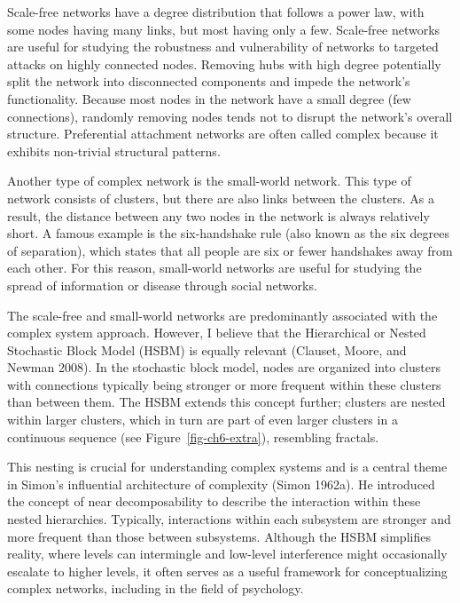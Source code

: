 \documentclass[
  a4paper,
  DIV=11,
  numbers=noendperiod]{scrreprt}
\begin{document}
Scale-free networks have a degree distribution that follows a power law,
with some nodes having many links, but most having only a few.
Scale-free networks are useful for studying the robustness and
vulnerability of networks to targeted attacks on highly connected nodes.
Removing hubs with high degree potentially split the network into
disconnected components and impede the network's functionality. Because
most nodes in the network have a small degree (few connections),
randomly removing nodes tends not to disrupt the network's overall
structure. Preferential attachment networks are often called complex
because it exhibits non-trivial structural patterns.

Another type of complex network is the small-world network. This type of
network consists of clusters, but there are also links between the
clusters. As a result, the distance between any two nodes in the network
is always relatively short. A famous example is the six-handshake rule
(also known as the six degrees of separation), which states that all
people are six or fewer handshakes away from each other. For this
reason, small-world networks are useful for studying the spread of
information or disease through social networks.

The scale-free and small-world networks are predominantly associated
with the complex system approach. However, I believe that the
Hierarchical or Nested Stochastic Block Model (HSBM) is equally relevant
(Clauset, Moore, and Newman 2008). In the stochastic block model, nodes
are organized into clusters with connections typically being stronger or
more frequent within these clusters than between them. The HSBM extends
this concept further; clusters are nested within larger clusters, which
in turn are part of even larger clusters in a continuous sequence (see
Figure~\ref{fig-ch6-extra}), resembling fractals.

This nesting is crucial for understanding complex systems and is a
central theme in Simon's influential architecture of complexity (Simon
1962a). He introduced the concept of near decomposability to describe
the interaction within these nested hierarchies. Typically, interactions
within each subsystem are stronger and more frequent than those between
subsystems. Although the HSBM simplifies reality, where levels can
intermingle and low-level interference might occasionally escalate to
higher levels, it often serves as a useful framework for conceptualizing
complex networks, including in the field of psychology.
\end{document}
